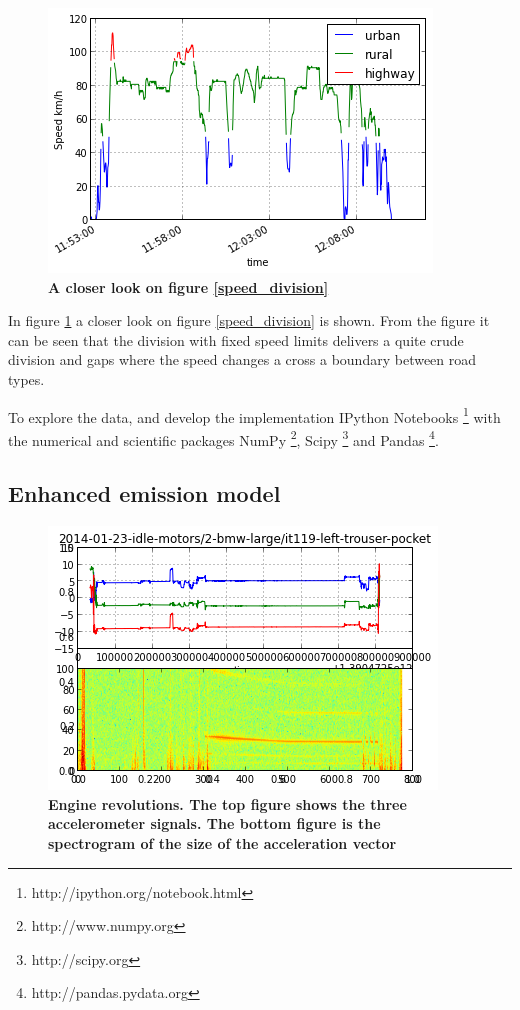 \begin{figure}[!ht]
\begin{center}
\includegraphics{speed_division_zoom.png}
\caption{{\bf A closer look on figure \ref{speed_division}}}
\label{speed_division_zoom}
\end{center}
\end{figure}

In figure \ref{speed_division_zoom} a closer look on figure \ref{speed_division} is shown. From the figure it can be seen that the division with fixed speed limits delivers a quite crude division and gaps where the speed changes a cross a boundary between road types. 

To explore the data, and develop the implementation IPython Notebooks \footnote{http://ipython.org/notebook.html} with the numerical and scientific packages NumPy \footnote{http://www.numpy.org}, Scipy \footnote{http://scipy.org} and Pandas \footnote{http://pandas.pydata.org}.

\subsection{Enhanced emission model}

\begin{figure}[!ht]
\begin{center}
\includegraphics{idle_BMW.png}
\caption{{\bf Engine revolutions. The top figure shows the three accelerometer signals. The bottom figure is the spectrogram of the size of the acceleration vector}}
\label{idle_bmw}
\end{center}
\end{figure}

